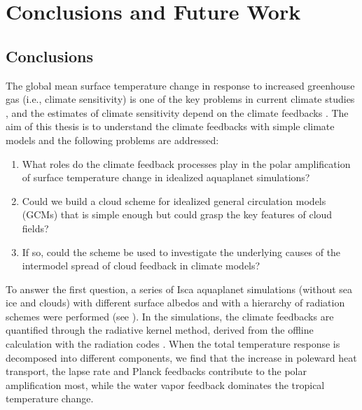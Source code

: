 \chapter{Conclusions and Future Work}
\label{ch:conclusion}

\section{Conclusions}

The global mean surface temperature change in response to increased greenhouse gas (i.e., climate sensitivity) is one of the key problems in current climate studies \citep[e.g.,][]{Bony2006,Stocker2013,Sherwood2020}, and the estimates of climate sensitivity depend on the climate feedbacks \citep{Bony2006,Soden2006}. The aim of this thesis is to understand the climate feedbacks with simple climate models and the following problems are addressed:
\begin{enumerate}
    \item What roles do the climate feedback processes play in the polar amplification of surface temperature change in idealized aquaplanet simulations?
    \item Could we build a cloud scheme for idealized general circulation models (GCMs) that is simple enough but could grasp the key features of cloud fields?
    \item If so, could the scheme be used to investigate the underlying causes of the intermodel spread of cloud feedback in climate models?
\end{enumerate}

To answer the first question, a series of Isca \citep{Vallis2018} aquaplanet simulations (without sea ice and clouds) with different surface albedos and with a hierarchy of radiation schemes were performed (see ). In the simulations, the climate feedbacks are quantified through the radiative kernel method, derived from the offline calculation with the radiation codes \citep{Liu2020kernel}. When the total temperature response is decomposed into different components, we find that the increase in poleward heat transport, the lapse rate and Planck feedbacks contribute to the polar amplification most, while the water vapor feedback dominates the tropical temperature change.


